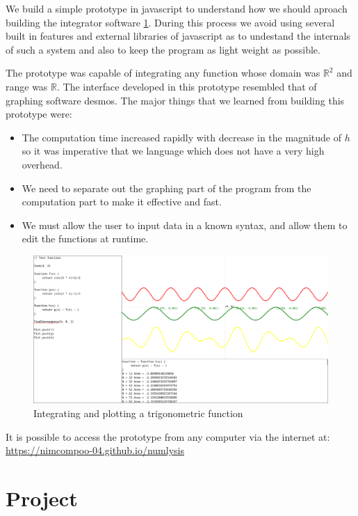 \documentclass[12pt]{article}
\begin{document}
We build a simple prototype in javascript to understand how we should aproach building the integrator software \ref{fig:prototype1}.
During this process we avoid using several built in features and external libraries of javascript as to undestand
the internals of such a system and also to keep the program as light weight as possible.

The prototype was capable of integrating any function whose domain was $\mathbb{R}^2$ and range was $\mathbb{R}$.
The interface developed in this prototype resembled that of graphing software desmos. The major things that we learned
from building this prototype were:
\begin{itemize}
	\item The computation time increased rapidly with decrease in the magnitude of $h$ so it was imperative that
		we language which does not have a very high overhead.

	\item We need to separate out the graphing part of the program from the computation part to make it effective and
		fast.

	\item We must allow the user to input data in a known syntax, and allow them to edit the functions at runtime.
\end{itemize}

\begin{figure}
	\includegraphics[width=\linewidth]{prototype.png}
	\caption{Integrating and plotting a trigonometric function}
	\label{fig:prototype1}
\end{figure}

It is possible to access the prototype from any computer via the internet at: \url{https://nimcompoo-04.github.io/numlysis} 


\section*{Project}
\end{document}
